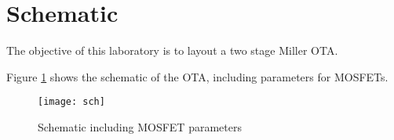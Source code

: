 \section{Schematic}

The objective of this laboratory is to layout a two stage Miller OTA.

Figure \ref{fig:sch} shows the schematic of the OTA, including parameters for MOSFETs.

\begin{figure}[!htb]
	\centering
	\texttt{[image: sch]}
	\caption{Schematic including MOSFET parameters}
	\label{fig:sch}
\end{figure}
